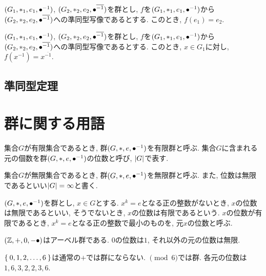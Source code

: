 \begin{prop}
  $(G_1,\ast_1,e_1,{\bullet}^{-1})$,
  $(G_2,\ast_2,e_2,{\bullet}^{\overline{-1}})$を群とし,
  $f$を$(G_1,\ast_1,e_1,{\bullet}^{-1})$から$(G_2,\ast_2,e_2,{\bullet}^{\overline{-1}})$への準同型写像であるとする.
  このとき, $f(e_1)=e_2$.
\end{prop}

\begin{prop}
  $(G_1,\ast_1,e_1,{\bullet}^{-1})$,
  $(G_2,\ast_2,e_2,{\bullet}^{\overline{-1}})$を群とし,
  $f$を$(G_1,\ast_1,e_1,{\bullet}^{-1})$から$(G_2,\ast_2,e_2,{\bullet}^{\overline{-1}})$への準同型写像であるとする.
  このとき, $x\in G_1$に対し, $f(x^{-1})=x^{\overline{-1}}$.
\end{prop}

\subsection{準同型定理}

\section{群に関する用語}
\begin{definition}
  
  集合$G$が有限集合であるとき,
  群$(G,\ast,e,{\bullet}^{-1})$を有限群と呼ぶ.
  集合$G$に含まれる元の個数を群$(G,\ast,e,{\bullet}^{-1})$の位数と呼び,
  $\left|G\right|$で表す.
  
  集合$G$が無限集合であるとき,
  群$(G,\ast,e,{\bullet}^{-1})$を無限群と呼ぶ.
  また, 位数は無限であるといい$\left|G\right|=\infty$と書く.
\end{definition}

\begin{definition}
  $(G,\ast,e,{\bullet}^{-1})$を群とし,
  $x\in G$とする.
  $x^k=e$となる正の整数がないとき,
  $x$の位数は無限であるといい,
  そうでないとき,
  $x$の位数は有限であるという.
  $x$の位数が有限であるとき,
  $x^k=e$となる正の整数で最小のものを,
  元$x$の位数と呼ぶ.
\end{definition}

\begin{example}
  $(\mathbb{Z},+,0,-{\bullet})$はアーベル群である.
  $0$の位数は$1$,
  それ以外の元の位数は無限.
\end{example}

\begin{example}
  $\Set{0,1,2,\ldots,6}$は通常の$+$では群にならない.
  $\pmod{6}$では群.
  各元の位数は$1,6,3,2,2,3,6$.
\end{example}


